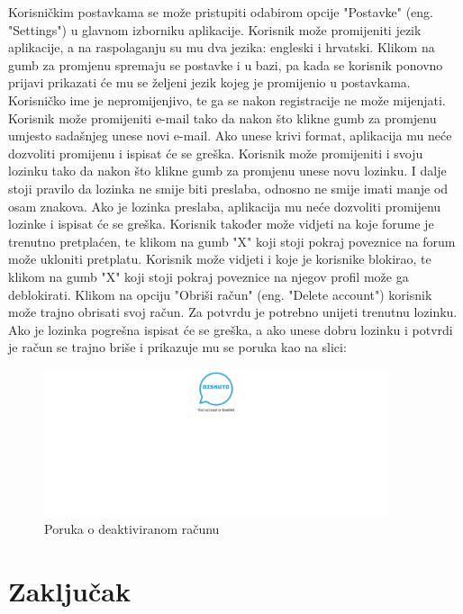 \documentclass{foi}
\begin{document}
Korisničkim postavkama se može pristupiti odabirom opcije "Postavke" (eng. "Settings") u glavnom izborniku aplikacije. Korisnik može promijeniti jezik aplikacije, a na raspolaganju su mu dva jezika: engleski i hrvatski. Klikom na gumb za promjenu spremaju se postavke i u bazi, pa kada se korisnik ponovno prijavi prikazati će mu se željeni jezik kojeg je promijenio u postavkama. Korisničko ime je nepromijenjivo, te ga se nakon registracije ne može mijenjati. Korisnik može promijeniti e-mail tako da nakon što klikne gumb za promjenu umjesto sadašnjeg unese novi e-mail. Ako unese krivi format, aplikacija mu neće dozvoliti promijenu i ispisat će se greška. Korisnik može promijeniti i svoju lozinku tako da nakon što klikne gumb za promjenu unese novu lozinku. I dalje stoji pravilo da lozinka ne smije biti preslaba, odnosno ne smije imati manje od osam znakova. Ako je lozinka preslaba, aplikacija mu neće dozvoliti promijenu lozinke i ispisat će se greška. Korisnik također može vidjeti na koje forume je trenutno pretplaćen, te klikom na gumb "X" koji stoji pokraj poveznice na forum može ukloniti pretplatu. Korisnik može vidjeti i koje je korisnike blokirao, te klikom na gumb "X" koji stoji pokraj poveznice na njegov profil može ga deblokirati. Klikom na opciju "Obriši račun" (eng. "Delete account") korisnik može trajno obrisati svoj račun. Za potvrdu je potrebno unijeti trenutnu lozinku. Ako je lozinka pogrešna ispisat će se greška, a ako unese dobru lozinku i potvrdi je račun se trajno briše i prikazuje mu se poruka kao na slici:

\begin{figure}[h!]
    \centering
    \includegraphics[width=0.9\textwidth]{slike/deaktivacija.png}
    \caption{Poruka o deaktiviranom računu}
\end{figure}

\chapter{Zaključak}

\printbibliography[title=Popis literature]

\listoffigures
{}
 
\listoftables
{}
\end{document}
